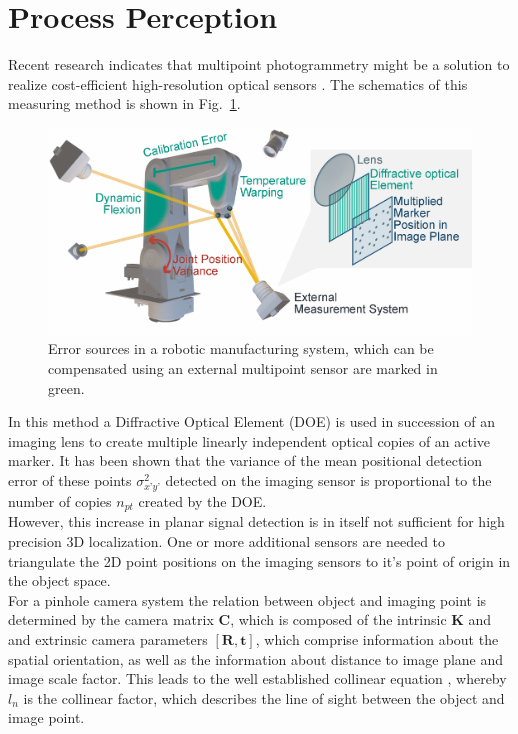 \documentclass[5p,times,procedia]{elsarticle}
\begin{document}
\section{Process Perception}
%
Recent research indicates that multipoint photogrammetry might be a solution to realize cost-efficient high-resolution optical sensors \cite{Hartlieb_2021}.
The schematics of this measuring method is shown in Fig.~\ref{fig:MeasSys_Errors}.
\begin{figure}[h]
	\centering
	\includegraphics[width=1.0\columnwidth]{graphics/error_sources.eps}
	\caption{Error sources in a robotic manufacturing system, which can be compensated using an external multipoint  sensor are marked in green.}
	\label{fig:MeasSys_Errors}
\end{figure}
In this method a Diffractive Optical Element (DOE) is used in succession of an imaging lens to create multiple linearly independent optical copies of an active marker.
It has been shown \cite{Hartlieb_2021} that the variance of the mean positional detection error of these points $\sigma_{x’y’}^2$ detected on the imaging sensor is proportional to the number of copies $n_{pt}$ created by the DOE.\\
However, this increase in planar signal detection is in itself not sufficient for high precision 3D localization. One or more additional sensors are needed to triangulate the 2D point positions on the imaging sensors to it’s point of origin in the object space. \\
For a pinhole camera system the relation between object and imaging point is determined by the camera matrix $\mathbf{C}$, which is composed of the intrinsic $\mathbf{K}$ and  and extrinsic camera parameters $[\mathbf{R}, \mathbf{t}]$, which comprise information about the spatial orientation, as well as the information about distance to image plane and
image scale factor. This leads to the well established collinear equation \cite{Luhmann2003}, whereby $l_n$ is the collinear factor, which describes the line of sight between the object and image point.
\end{document}
